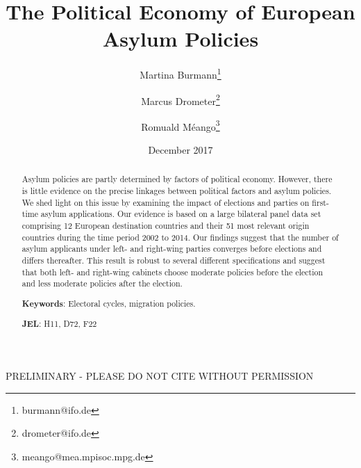 \documentclass[a4paper,12pt]{article}
\title{The Political Economy of European Asylum Policies}
\date{December 2017}
\author[,1]{Martina Burmann\thanks{burmann@ifo.de}}
\author[,1]{Marcus Drometer\thanks{drometer@ifo.de}}
\author[,2]{Romuald M\'eango\thanks{meango@mea.mpisoc.mpg.de}}
\affil[1]{ifo Institute for Economic Research, Munich}
\affil[2]{Munich Center for the Economics of Aging (MEA)}
\begin{document}
      \maketitle

\begin{center}
PRELIMINARY - PLEASE DO NOT CITE WITHOUT PERMISSION
\end{center}
\begin{abstract}
\singlespacing
\noindent 
Asylum policies are partly determined by factors of political economy. However, there is little evidence on the precise linkages between political factors and asylum policies. We shed light on this issue by examining the impact of elections and parties on first-time asylum applications.  Our evidence is based on a large bilateral panel data set comprising 12 European destination countries and their 51 most relevant origin countries during the time period 2002 to 2014. Our findings suggest that  the number of asylum applicants under left- and right-wing parties converges before elections and differs thereafter. This result is robust to several different specifications and suggest that both left- and right-wing cabinets choose moderate policies before the election and less moderate policies after the election.

\bigskip

\textbf{Keywords}: Electoral cycles, migration policies.

\textbf{JEL}: H11, D72, F22

\bigskip
\end{abstract}
\setcounter{page}{0} \renewcommand{\thepage}{}
\pagebreak{}\pagebreak

\end{document}
